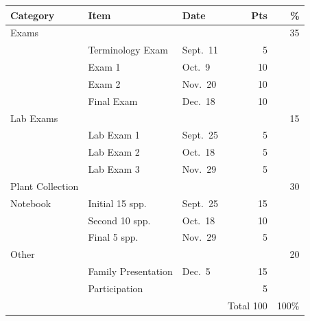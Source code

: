 \documentclass{tufte-handout}
\begin{document}
\begin{table}
\begin{tabular}{l l l r r}
Category & Item & Date &  Pts & \% \\
\hline
Exams & & & & 35 \\
& Terminology Exam & Sept.~11 & 5\\
& Exam 1 & Oct.~9  & 10 \\
& Exam 2 & Nov.~20  & 10 \\
& Final Exam & Dec.~18 & 10 \\ 
\hline
Lab Exams & & & & 15\\
& Lab Exam 1 & Sept.~25  & 5 \\
& Lab Exam 2 & Oct.~18 & 5 \\
& Lab Exam 3 & Nov.~29  & 5 \\ 	
\hline
Plant Collection & & & & 30 \\
Notebook & Initial 15 spp. & Sept.~25 & 15 \\
& Second 10 spp. & Oct.~18 & 10 \\
& Final 5 spp. & Nov.~29 & 5 \\
\hline 
Other & & & & 20 \\
& Family Presentation & Dec.~5 & 15 \\
 & Participation &  & 5 \\
\hline
& & & Total 100 & 100\%
\end{tabular}
\end{table}
\end{document}
